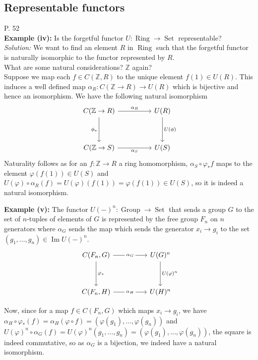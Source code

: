 \documentclass[a4paper]{article}
\DeclareMathOperator{\Ima}{Im}
\DeclareMathOperator{\Set}{Set}
\DeclareMathOperator{\Group}{Group}
\DeclareMathOperator{\Ring}{Ring}
\begin{document}
    \subsection*{Representable functors}
P. 52\\
\textbf{Example (iv):} Is the forgetful functor
$U  \colon \Ring \to \Set$ representable?\\
\linebreak
\textit{Solution:} We want to find an element $R$
in $\Ring$ such that
the forgetful functor is naturally isomorphic to
the functor represented by $R$.\\
What are some natural considerations? $\mathbb{Z}$ again?\\
Suppose we map each
$f \in C(\mathbb{Z}, R)$ to the unique
element $f(1) \in U(R)$. This induces a well defined
map $\alpha_R  \colon C(\mathbb{Z}\to R) \to U(R)$ which is
bijective and hence an isomorphism. We have the following natural isomorphism
\[\begin{tikzcd}
	{C(\mathbb{Z}\to R)} && {U(R)} \\
	\\
	{C(\mathbb{Z}\to S)} && {U(S)}
	\arrow["{\alpha_R}", from=1-1, to=1-3]
	\arrow["{\phi_*}"', from=1-1, to=3-1]
	\arrow["{U(\phi)}", from=1-3, to=3-3]
	\arrow["{\alpha_{S}}"', from=3-1, to=3-3]
\end{tikzcd}\]
Naturality follows as
for an $f  \colon \mathbb{Z} \to R$ a ring homomorphism,
$\alpha_{S} \circ \varphi_* f$ maps to
the element
$\varphi \left( f(1) \right) \in U(S)$ and
$U(\varphi) \circ \alpha_R (f) =
U(\varphi) (f(1)) =
\varphi \left( f(1) \right) \in U(S)$, so it is indeed a natural isomorphism.

\textbf{Example (v):} The functor $U(-)^{n}  \colon
\Group \to \Set$ that sends a group $G$ to the set of $n$-tuples of
elements of $G$ is represented by the free group $F_n$ on $n$ generators
where $\alpha_G$ sends
the map which sends the generator $x_i \to g_i$ to
the set $(g_1, \ldots, g_n) \in \Ima U(-)^{n}$.
\[\begin{tikzcd}
	{C(F_n,G)} && {U(G)^n} \\
	\\
	{C(F_n,H)} && {U(H)^n}
	\arrow["{\varphi_*}", from=1-1, to=3-1]
	\arrow["{U(\varphi)^n}", from=1-3, to=3-3]
	\arrow["{\alpha_G}"{description}, from=1-1, to=1-3]
	\arrow["{\alpha_H}"{description}, from=3-1, to=3-3]
\end{tikzcd}\]

Now, since for a map
$f \in C(F_n, G)$ which maps
$x_i \to g_i$, we have
$\alpha_H \circ \varphi_* (f) = 
\alpha_H \left( \varphi \circ f \right) 
= \left( \varphi(g_1), \ldots, \varphi(g_n) \right) $ and
$U\left( \varphi \right)^{n} \circ
\alpha_G \left( f \right) = 
U\left( \varphi \right)^{n} \left( g_1, \ldots, g_n \right) 
= \left( \varphi(g_1), \ldots, \varphi(g_n) \right) $, the
square is indeed commutative, so as $\alpha_G$ is a bijection, 
we indeed have a natural isomorphism.\\
\linebreak
\end{document}
